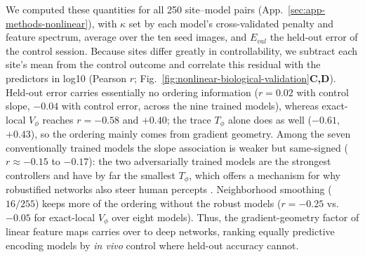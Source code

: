We computed these quantities for all 250 site--model pairs (App.~\ref{sec:app-methods-nonlinear}), with $\kappa$ set by each model's cross-validated penalty and feature spectrum, average over the ten seed images, and $E_{val}$ the held-out error of the control session. Because sites differ greatly in controllability, {we subtract each site's mean from the control outcome and correlate this residual with the predictors in log10 (Pearson $r$; Fig.~\ref{fig:nonlinear-biological-validation}\textbf{C,D})}. Held-out error carries essentially no ordering information ({$r=0.02$} with control slope, {$-0.04$} with control error, across the nine trained models), whereas exact-local $V_\phi$ reaches {$r=-0.58$ and $+0.40$}; the trace $T_\phi$ alone does {as well ($-0.61$, $+0.43$)}, so the ordering mainly comes from gradient geometry. Among the seven conventionally trained models the slope association is weaker but same-signed ({$r\approx-0.15$ to $-0.17$}): the two adversarially trained models are the strongest controllers and have by far the smallest $T_\phi$, which offers a mechanism for why robustified networks also steer human percepts \citep{gaziv2023strongPreciseModulation}. {Neighborhood smoothing ($16/255$) keeps more of the ordering without the robust models ($r=-0.25$ vs.\ $-0.05$ for exact-local $V_\phi$ over eight models).} Thus, the gradient-geometry factor of linear feature maps carries over to deep networks, ranking equally predictive encoding models by \textit{in vivo} control where held-out accuracy cannot. %

\vspace{-7pt}
